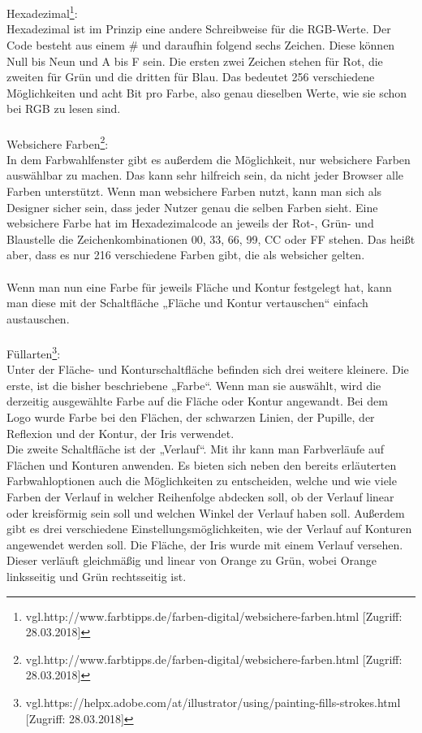 \leavevmode \\
\leavevmode \\
Hexadezimal\footnote{\label{} vgl.http://www.farbtipps.de/farben-digital/websichere-farben.html [Zugriff: 28.03.2018]}:
\leavevmode \\
Hexadezimal ist im Prinzip eine andere Schreibweise für die RGB-Werte. Der Code besteht aus einem \# und daraufhin folgend sechs Zeichen. Diese können Null bis Neun und A bis F sein. Die ersten zwei Zeichen stehen für Rot, die zweiten für Grün und die dritten für Blau. Das bedeutet 256 verschiedene Möglichkeiten und acht Bit pro Farbe, also genau dieselben Werte, wie sie schon bei RGB zu lesen sind.
\leavevmode \\
\leavevmode \\
Websichere Farben\footnote{\label{} vgl.http://www.farbtipps.de/farben-digital/websichere-farben.html [Zugriff: 28.03.2018]}:
\leavevmode \\
In dem Farbwahlfenster gibt es außerdem die Möglichkeit, nur websichere Farben auswählbar zu machen. Das kann sehr hilfreich sein, da nicht jeder Browser alle Farben unterstützt. Wenn man websichere Farben nutzt, kann man sich als Designer sicher sein, dass jeder Nutzer genau die selben Farben sieht. Eine websichere Farbe hat im Hexadezimalcode an jeweils der Rot-, Grün- und Blaustelle die Zeichenkombinationen 00, 33, 66, 99, CC oder FF stehen. Das heißt aber, dass es nur 216 verschiedene Farben gibt, die als websicher gelten.
\leavevmode \\
\leavevmode \\
Wenn man nun eine Farbe für jeweils Fläche und Kontur festgelegt hat, kann man diese mit der Schaltfläche „Fläche und Kontur vertauschen“ einfach austauschen.
\leavevmode \\
\leavevmode \\
Füllarten\footnote{\label{} vgl.https://helpx.adobe.com/at/illustrator/using/painting-fills-strokes.html [Zugriff: 28.03.2018]}:
\leavevmode \\
Unter der Fläche- und Konturschaltfläche befinden sich drei weitere kleinere. Die erste, ist die bisher beschriebene „Farbe“. Wenn man sie auswählt, wird die derzeitig ausgewählte Farbe auf die Fläche oder Kontur angewandt. Bei dem Logo wurde Farbe bei den Flächen, der schwarzen Linien, der Pupille, der Reflexion und der Kontur, der Iris verwendet.
\leavevmode \\
Die zweite Schaltfläche ist der „Verlauf“. Mit ihr kann man Farbverläufe auf Flächen und Konturen anwenden. Es bieten sich neben den bereits erläuterten Farbwahloptionen auch die Möglichkeiten zu entscheiden, welche und wie viele Farben der Verlauf in welcher Reihenfolge abdecken soll, ob der Verlauf linear oder kreisförmig sein soll und welchen Winkel der Verlauf haben soll. Außerdem gibt es drei verschiedene Einstellungsmöglichkeiten, wie der Verlauf auf Konturen angewendet werden soll. Die Fläche, der Iris wurde mit einem Verlauf versehen. Dieser verläuft gleichmäßig und linear von Orange zu Grün, wobei Orange linksseitig und Grün rechtsseitig ist.
